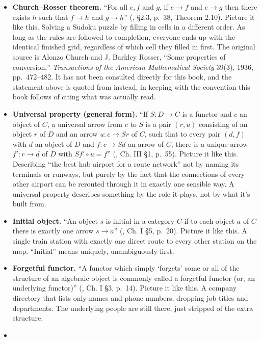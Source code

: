 \begin{itemize}
\item
  \textbf{Church--Rosser theorem.} ``For all \(e, f\) and \(g\), if \(e \to f\) and \(e \to g\) then there exists \(h\) such that \(f \to h\) and \(g \to h\)'' (\cite{Thompson1991}, §2.3, p.~38, Theorem 2.10). Picture it like this. Solving a Sudoku puzzle by filling in cells in a different order. As long as the rules are followed to completion, everyone ends up with the identical finished grid, regardless of which cell they filled in first. The original source is Alonzo Church and J. Barkley Rosser, ``Some properties of conversion,'' \emph{Transactions of the American Mathematical Society} 39(3), 1936, pp.~472--482. It has not been consulted directly for this book, and the statement above is quoted from \cite{Thompson1991} instead, in keeping with the convention this book follows of citing what was actually read.
\item
  \textbf{Universal property (general form).} ``If \(S : D \to C\) is a functor and \(c\) an object of \(C\), a universal arrow from \(c\) to \(S\) is a pair \((r, u)\) consisting of an object \(r\) of \(D\) and an arrow \(u : c \to Sr\) of \(C\), such that to every pair \((d, f)\) with \(d\) an object of \(D\) and \(f : c \to Sd\) an arrow of \(C\), there is a unique arrow \(f' : r \to d\) of \(D\) with \(Sf' \circ u = f\)'' (\cite{MacLane1998}, Ch. III §1, p.~55). Picture it like this. Describing ``the best hub airport for a route network'' not by naming its terminals or runways, but purely by the fact that the connections of every other airport can be rerouted through it in exactly one sensible way. A universal property describes something by the role it plays, not by what it's built from.
\item
  \textbf{Initial object.} ``An object \(s\) is initial in a category \(C\) if to each object \(a\) of \(C\) there is exactly one arrow \(s \to a\)'' (\cite{MacLane1998}, Ch. I §5, p.~20). Picture it like this. A single train station with exactly one direct route to every other station on the map. ``Initial'' means uniquely, unambiguously first.
\item
  \textbf{Forgetful functor.} ``A functor which simply `forgets' some or all of the structure of an algebraic object is commonly called a forgetful functor (or, an underlying functor)'' (\cite{MacLane1998}, Ch. I §3, p.~14). Picture it like this. A company directory that lists only names and phone numbers, dropping job titles and departments. The underlying people are still there, just stripped of the extra structure.
\item

\end{itemize}
